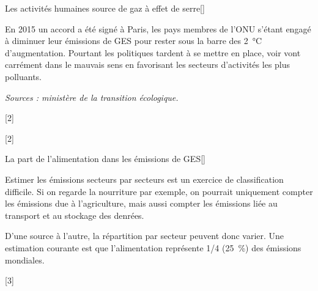 \begin{doc}{Les activités humaines source de gaz à effet de serre}[\label{doc:source_GES}]
  
  En 2015 un accord a été signé à Paris, les pays membres de l'ONU s'étant engagé à diminuer leur émissions de GES pour rester sous la barre des \qty{2}{\degreeCelsius} d'augmentation.
  Pourtant les politiques tardent à se mettre en place, voir vont carrément dans le mauvais sens en favorisant les secteurs d'activités les plus polluants.

  \begin{center}


    
    \textit{Sources : ministère de la transition écologique.}
  \end{center}
\end{doc}

[2]

[2]


\begin{doc}{La part de l'alimentation dans les émissions de GES}[\label{doc:alim_GES}]
  
  Estimer les émissions secteurs par secteurs est un exercice de classification difficile.
  Si on regarde la nourriture par exemple, on pourrait uniquement compter les émissions due à l'agriculture,
  mais aussi compter les émissions liée au transport et au stockage des denrées.

  D'une source à l'autre, la répartition par secteur peuvent donc varier.
  Une estimation courante est que l'alimentation représente 1/4 (\qty{25}{\percent}) des émissions mondiales.
\end{doc}

[3]